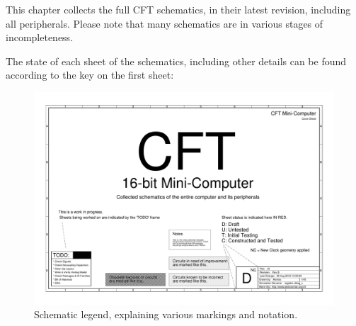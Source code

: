 
This chapter collects the full CFT schematics, in their latest
revision, including all peripherals. Please note that many schematics
are in various stages of incompleteness.

The state of each sheet of the schematics, including other details can
be found according to the key on the first sheet:

\begin{figure}[h!]
  \centering
  \includegraphics[width=\columnwidth]{figs/schematic-legend.pdf}
  \caption{\label{fig:schematic-legend}Schematic legend, explaining
    various markings and notation.}
\end{figure}

\newpage

%


%

